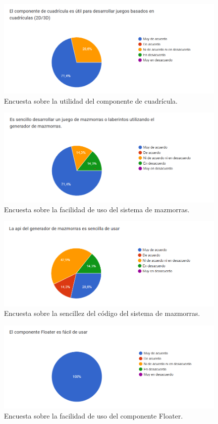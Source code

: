 \begin{figure}[H]
  \centering
  \includegraphics[width=450px,clip=true]{CUESTIONARIO_13.png}
  \caption{Encuesta sobre la utilidad del componente de cuadrícula.}
  \label{fig:CUESTIONARIO_13}
\end{figure}
\raggedbottom

\begin{figure}[H]
  \centering
  \includegraphics[width=450px,clip=true]{CUESTIONARIO_14.png}
  \caption{Encuesta sobre la facilidad de uso del sistema de mazmorras.}
  \label{fig:CUESTIONARIO_14}
\end{figure}
\raggedbottom

\begin{figure}[H]
  \centering
  \includegraphics[width=450px,clip=true]{CUESTIONARIO_15.png}
  \caption{Encuesta sobre la sencillez del código del sistema de mazmorras.}
  \label{fig:CUESTIONARIO_15}
\end{figure}
\raggedbottom

\begin{figure}[H]
  \centering
  \includegraphics[width=450px,clip=true]{CUESTIONARIO_16.png}
  \caption{Encuesta sobre la facilidad de uso del componente Floater.}
  \label{fig:CUESTIONARIO_16}
\end{figure}
\raggedbottom

